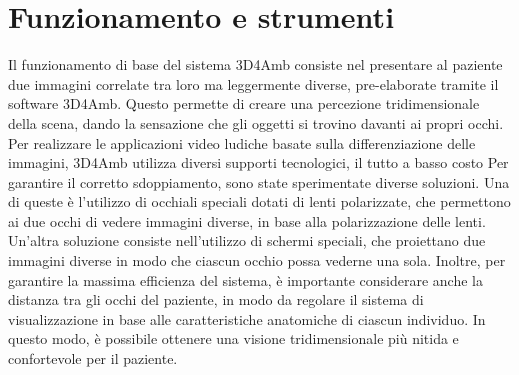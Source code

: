 \documentclass[
a4paper,
cleardoublepage=empty,
headings=twolinechapter,
numbers=autoenddot,
]{scrbook}
\begin{document}
	\section{Funzionamento e strumenti}
	Il funzionamento di base del sistema 3D4Amb consiste nel presentare al paziente due immagini correlate tra loro ma leggermente diverse, pre-elaborate tramite il software 3D4Amb. Questo permette di creare una percezione tridimensionale della scena, dando la sensazione che gli oggetti si trovino davanti ai propri occhi.
	Per realizzare le applicazioni video ludiche basate sulla differenziazione delle immagini, 3D4Amb utilizza diversi supporti tecnologici, il tutto a basso costo
	Per garantire il corretto sdoppiamento, sono state sperimentate diverse soluzioni. Una di queste è l'utilizzo di occhiali speciali dotati di lenti polarizzate, che permettono ai due occhi di vedere immagini diverse, in base alla polarizzazione delle lenti. Un'altra soluzione consiste nell'utilizzo di schermi speciali, che proiettano due immagini diverse in modo che ciascun occhio possa vederne una sola.
	Inoltre, per garantire la massima efficienza del sistema, è importante considerare anche la distanza tra gli occhi del paziente, in modo da regolare il sistema di visualizzazione in base alle caratteristiche anatomiche di ciascun individuo. In questo modo, è possibile ottenere una visione tridimensionale più nitida e confortevole per il paziente.
\end{document}

